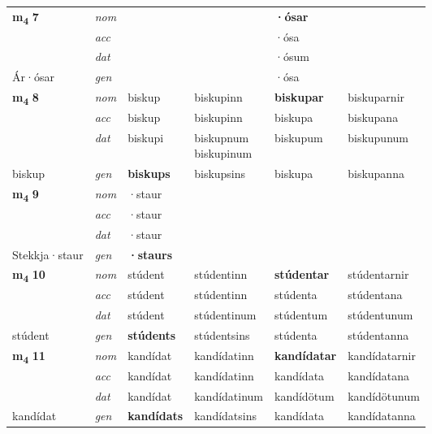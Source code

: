 \begin{longtable}[l]{X>{\footnotesize\itshape}XXXXX}
\multirow{3}{*}{{{\textbf{m{\textsubscript{4}}} \Large{\textbf{7}}}}} & nom &  &  & \textbf{·ósar} &  \\*
 & acc &  &  & ·ósa &  \\*
 & dat &  &  & ·ósum &  \\*
 {\footnotesize{Ár\allowbreak ·ósar}} & gen & \textbf{} &  & ·ósa &  \\

\multirow{3}{*}{{{\textbf{m{\textsubscript{4}}} \Large{\textbf{8}}}}} & nom & biskup & biskupinn & \textbf{biskupar} & biskuparnir \\*
 & acc & biskup & biskupinn & biskupa & biskupana \\*
 & dat & biskupi & \specialcell{biskupnum\\ biskupinum} & biskupum & biskupunum \\*
 {\footnotesize{biskup}} & gen & \textbf{biskups} & biskupsins & biskupa & biskupanna \\
\cmidrule{1-6}

\multirow{3}{*}{{{\textbf{m{\textsubscript{4}}} \Large{\textbf{9}}}}} & nom & ·staur &  & \textbf{} &  \\*
 & acc & ·staur &  &  &  \\*
 & dat & ·staur &  &  &  \\*
 {\footnotesize{Stekkja\allowbreak ·staur}} & gen & \textbf{·staurs} &  &  &  \\
\cmidrule{1-6}

\multirow{3}{*}{{{\textbf{m{\textsubscript{4}}} \Large{\textbf{10}}}}} & nom & stúdent & stúdentinn & \textbf{stúdentar} & stúdentarnir \\*
 & acc & stúdent & stúdentinn & stúdenta & stúdentana \\*
 & dat & stúdent & stúdentinum & stúdentum & stúdentunum \\*
 {\footnotesize{stúdent}} & gen & \textbf{stúdents} & stúdentsins & stúdenta & stúdentanna \\
\cmidrule{1-6}

\multirow{3}{*}{{{\textbf{m{\textsubscript{4}}} \Large{\textbf{11}}}}} & nom & kandídat & kandídatinn & \textbf{kandídatar} & kandídatarnir \\*
 & acc & kandídat & kandídatinn & kandídata & kandídatana \\*
 & dat & kandídat & kandídatinum & kandídötum & kandídötunum \\*
 {\footnotesize{kandídat}} & gen & \textbf{kandídats} & kandídatsins & kandídata & kandídatanna \\
\cmidrule{1-6}


\end{longtable}

